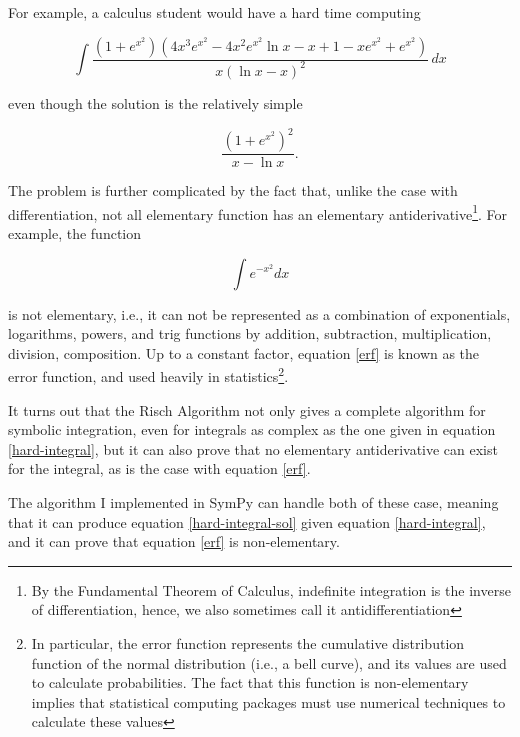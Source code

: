 \documentclass[12pt]{article}
\begin{document}
For example, a calculus student would have a hard time computing

\begin{equation}
\label{hard-integral}
\int{
    \frac{\left( 1 + e^{x^2} \right)
        \left(4x^3e^{x^2} - 4x^2e^{x^2}\ln{x} - x + 1 - xe^{x^2} +
        e^{x^2}\right)}
    {x\left(\ln{x} - x\right)^2}\,dx}
\end{equation}

even though the solution is the relatively simple 

\begin{equation}
\label{hard-integral-sol}
\frac{\left(1 + e^{x^{2}}\right)^{2}}{x - \ln{x}}.
\end{equation}

The problem is further complicated by the fact that, unlike the case
with differentiation, not all elementary function has an elementary
antiderivative\footnote{By the Fundamental Theorem of Calculus,
indefinite integration is the inverse of differentiation, hence, we also
sometimes call it antidifferentiation}.  For example, the function

\begin{equation}
\label{erf}
\int{e^{-x^2}dx}
\end{equation}

is not elementary, i.e., it can not be represented as a combination of
exponentials, logarithms, powers, and trig functions by addition,
subtraction, multiplication, division, composition.  Up to a constant
factor, equation \ref{erf} is known as the error function, and used
heavily in statistics\footnote{In particular, the error function
represents the cumulative distribution function of the normal
distribution (i.e., a bell curve), and its values are used to calculate
probabilities.  The fact that this function is non-elementary implies
that statistical computing packages must use numerical techniques to
calculate these values}.

It turns out that the Risch Algorithm not only gives a complete
algorithm for symbolic integration, even for integrals as complex as the
one given in equation \ref{hard-integral}, but it can also prove that no
elementary antiderivative can exist for the integral, as is the case
with equation \ref{erf}.

The algorithm I implemented in Sym\-Py can handle both of these case,
meaning that it can produce equation \ref{hard-integral-sol} given
equation \ref{hard-integral}, and it can prove that equation \ref{erf}
is non-elementary.
\end{document}
